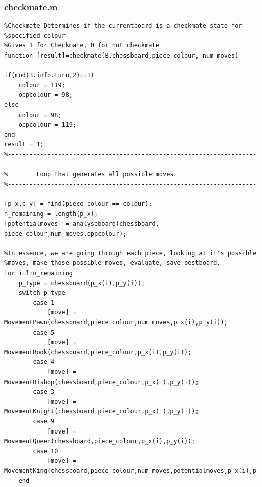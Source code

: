 \documentclass[11pt,a4paper]{article}
\begin{document}
\subsubsection{checkmate.m}
\begin{lstlisting}
%Checkmate Determines if the currentboard is a checkmate state for
%specified colour
%Gives 1 for Checkmate, 0 for not checkmate
function [result]=checkmate(B,chessboard,piece_colour, num_moves)

if(mod(B.info.turn,2)==1)
    colour = 119;
    oppcolour = 98;
else
    colour = 98;
    oppcolour = 119;
end
result = 1;
%-------------------------------------------------------------------------
%        Loop that generates all possible moves
%-------------------------------------------------------------------------
[p_x,p_y] = find(piece_colour == colour);
n_remaining = length(p_x);
[potentialmoves] = analyseboard(chessboard, piece_colour,num_moves,oppcolour);

%In essence, we are going through each piece, looking at it's possible
%moves, make those possible moves, evaluate, save bestboard.
for i=1:n_remaining
    p_type = chessboard(p_x(i),p_y(i));
    switch p_type
        case 1
            [move] = MovementPawn(chessboard,piece_colour,num_moves,p_x(i),p_y(i));
        case 5
            [move] = MovementRook(chessboard,piece_colour,p_x(i),p_y(i)); 
        case 4
            [move] = MovementBishop(chessboard,piece_colour,p_x(i),p_y(i));
        case 3
            [move] = MovementKnight(chessboard,piece_colour,p_x(i),p_y(i));
        case 9
            [move] = MovementQueen(chessboard,piece_colour,p_x(i),p_y(i));
        case 10
            [move] = MovementKing(chessboard,piece_colour,num_moves,potentialmoves,p_x(i),p_y(i));
    end


\end{lstlisting}
\end{document}
